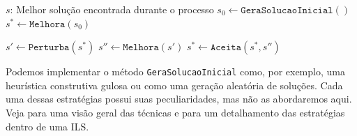         

\begin{algorithm}
\caption{Busca Local Iterada}
\label{alg:ils}
\begin{algorithmic}[1]
    \Ensure
        $s$: Melhor solução encontrada durante o processo
    \State $s_0 \gets \texttt{GeraSolucaoInicial}()$ 
    \State $s^* \gets \texttt{Melhora}(s_0)$
        
        \State $s' \gets \texttt{Perturba}(s^*)$
        \State $s'' \gets \texttt{Melhora}(s')$
        \State $s^* \gets \texttt{Aceita}(s^*, s'')$
    \EndWhile
\end{algorithmic}
\end{algorithm}

        

Podemos implementar o método \texttt{GeraSolucaoInicial} como, por exemplo, uma heurística construtiva gulosa ou como uma geração aleatória de soluções. Cada uma dessas estratégias possui suas peculiaridades, mas não as abordaremos aqui. Veja \cite{talbi} para uma visão geral das técnicas e \cite{lourencco2018iterated} para um detalhamento das estratégias dentro de uma \ac{ILS}.

